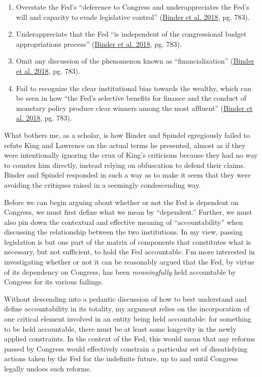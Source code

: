 \documentclass[
  11pt,
]{article}
\providecommand{\tightlist}{%
  \setlength{\itemsep}{0pt}\setlength{\parskip}{0pt}}
\begin{document}
\begin{enumerate}
\def\labelenumi{\arabic{enumi}.}
\tightlist
\item
  Overstate the Fed's ``deference to Congress and underappreciates the
  Fed's will and capacity to evade legislative control''
  (\protect\hyperlink{ref-binder2018c}{Binder et al. 2018}, pg. 783).
\item
  Underappreciate that the Fed ``is independent of the congressional
  budget appropriations process''
  (\protect\hyperlink{ref-binder2018c}{Binder et al. 2018}, pg. 783).
\item
  Omit any discussion of the phenomenon known as ``financialization''
  (\protect\hyperlink{ref-binder2018c}{Binder et al. 2018}, pg. 783).
\item
  Fail to recognize the clear institutional bias towards the wealthy,
  which can be seen in how ``the Fed's selective beneﬁts for ﬁnance and
  the conduct of monetary policy produce clear winners among the most
  afﬂuent'' (\protect\hyperlink{ref-binder2018c}{Binder et al. 2018},
  pg. 783).
\end{enumerate}

What bothers me, as a scholar, is how Binder and Spindel egregiously
failed to refute King and Lawrence on the actual terms he presented,
almost as if they were intentionally ignoring the crux of King's
criticisms because they had no way to counter him directly, instead
relying on obfuscation to defend their claims. Binder and Spindel
responded in such a way as to make it seem that they were avoiding the
critiques raised in a seemingly condescending way.

Before we can begin arguing about whether or not the Fed is dependent on
Congress, we must first define what we mean by ``dependent.'' Further,
we must also pin down the contextual and effective meaning of
``accountability'' when discussing the relationship between the two
institutions. In my view, passing legislation is but one part of the
matrix of components that constitutes what is necessary, but not
sufficient, to hold the Fed accountable. I'm more interested in
investigating whether or not it can be reasonably argued that the Fed,
by virtue of its dependency on Congress, has been \emph{meaningfully}
held accountable by Congress for its various failings.

Without descending into a pedantic discussion of how to best understand
and define accountability in its totality, my argument relies on the
incorporation of one critical element involved in an entity being held
accountable: for something to be held accountable, there must be at
least some longevity in the newly applied constraints. In the context of
the Fed, this would mean that any reforms passed by Congress would
effectively constrain a particular set of dissatisfying actions taken by
the Fed for the indefinite future, up to and until Congress legally
undoes such reforms.
\end{document}
